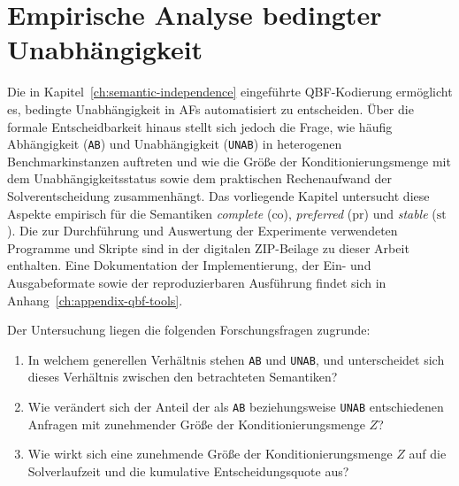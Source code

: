 \chapter{Empirische Analyse bedingter Unabhängigkeit}
\label{ch:empirical-analysis}

Die in Kapitel~\ref{ch:semantic-independence} eingeführte QBF-Kodierung
ermöglicht es, bedingte Unabhängigkeit in AFs automatisiert zu entscheiden.
Über die formale Entscheidbarkeit hinaus stellt sich jedoch die Frage, wie
häufig Abhängigkeit (\texttt{AB}) und Unabhängigkeit (\texttt{UNAB}) in
heterogenen Benchmarkinstanzen auftreten und wie die Größe der
Konditionierungsmenge mit dem Unabhängigkeitsstatus sowie dem praktischen
Rechenaufwand der Solverentscheidung zusammenhängt. Das vorliegende Kapitel 
untersucht diese Aspekte empirisch für die Semantiken \emph{complete} 
(\(\mathrm{co}\)), \emph{preferred} (\(\mathrm{pr}\)) und
\emph{stable} (\(\mathrm{st}\)). Die zur Durchführung und Auswertung der
Experimente verwendeten Programme und Skripte sind in der digitalen
ZIP-Beilage zu dieser Arbeit enthalten.
Eine Dokumentation der Implementierung, der Ein- und Ausgabeformate sowie der
reproduzierbaren Ausführung findet sich in
Anhang~\ref{ch:appendix-qbf-tools}.

Der Untersuchung liegen die folgenden Forschungsfragen zugrunde:

\begin{enumerate}
    \item[\textbf{Frage 1}] In welchem generellen Verhältnis stehen
    \texttt{AB} und \texttt{UNAB}, und unterscheidet sich dieses
    Verhältnis zwischen den betrachteten Semantiken?
    \item[\textbf{Frage 2}] Wie verändert sich der Anteil der als
    \texttt{AB} beziehungsweise \texttt{UNAB} entschiedenen Anfragen mit
    zunehmender Größe der Konditionierungsmenge \(Z\)?
    \item[\textbf{Frage 3}] Wie wirkt sich eine zunehmende Größe der
    Konditionierungsmenge \(Z\) auf die Solverlaufzeit und die kumulative
    Entscheidungsquote aus?
\end{enumerate}

